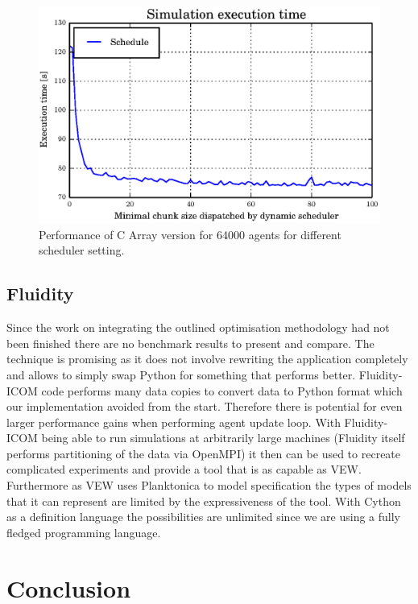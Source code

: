 \documentclass[12pt, a4paper]{report}
\begin{document}
\begin{figure}[H]
  \begin{center}
    \includegraphics[width=\columnwidth]{graphs/schedule-low.eps}
    \caption{Performance of C Array version for 64000 agents for different scheduler setting.}
    \label{fig:schedule-low}
  \end{center}
\end{figure}

\section{Fluidity}\label{sec:fluid-appcl}
Since the work on integrating the outlined optimisation methodology had
not been finished there are no benchmark results to present and compare.
The technique is promising as it does not involve rewriting the application
completely and allows to simply swap Python for something that performs
better. Fluidity-ICOM code performs many data copies to convert data
to Python format which our implementation avoided from the start. Therefore
there is potential for even larger performance gains when performing
agent update loop. With Fluidity-ICOM being able to run simulations
at arbitrarily large machines (Fluidity itself performs partitioning
of the data via OpenMPI) it then can be used to recreate complicated
experiments and provide a tool that is as capable as VEW. Furthermore
as VEW uses Planktonica to model specification the types of models that
it can represent are limited by the expressiveness of the tool. With
Cython as a definition language the possibilities are unlimited  since
we are using a fully fledged programming language.

\chapter{Conclusion}\label{ch:concl}
\end{document}
